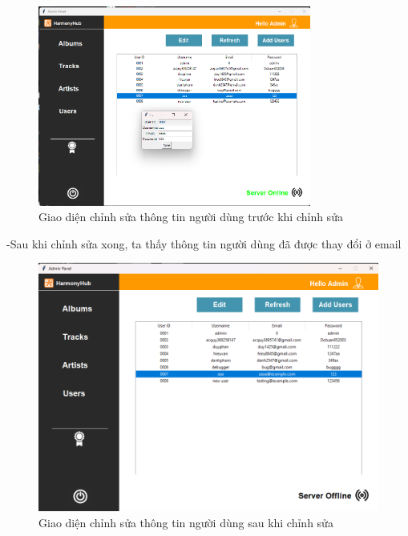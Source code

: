 \documentclass[a4paper]{article}
\begin{document}
\begin{flushleft}
	\begin{figure}
		\centering
		\includegraphics[width=0.8\textwidth]{images/editUserForm.png}
		\caption{Giao diện chỉnh sửa thông tin người dùng trước khi chỉnh sửa}
	\end{figure}

	-Sau khi chỉnh sửa xong, ta thấy thông tin người dùng đã được thay đổi ở email

	\begin{figure}[h]
		\centering
		\includegraphics[width=\textwidth]{images/aftereditinguser.png}
		\caption{Giao diện chỉnh sửa thông tin người dùng sau khi chỉnh sửa}
	\end{figure}
\end{flushleft}
\clearpage
\newpage
\end{document}
